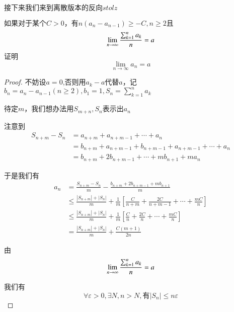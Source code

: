 \documentclass[lang=cn,10pt]{elegantbook}
\begin{document}
	接下来我们来到离散版本的反向$stolz$
	\begin{example}
		$\text{如果对于某个}C>0\text{，有}n\left( a_n-a_{n-1} \right) \ge -C,n\ge 2\text{且}$
		\begin{equation*}
			\lim_{n\rightarrow \infty} \small{\frac{\sum_{k=1}^n{a_k}}{n}}=a
		\end{equation*}
		证明
		\begin{equation*}
			\lim_{n\rightarrow \infty} a_n=a
		\end{equation*}
	\end{example}
	\begin{proof}
		不妨设$a=0$,否则用$a_{k}-a$代替$a$，记$b_{n}=a_{n}-a_{n-1}(n\ge 2),b_{1}=1,S_{n}=\sum_{k=1}^n{a_k}$
		
		待定$m$，我们想办法用$S_{m+n},S_{n}$表示出$a_{n}$
		
		注意到
		\begin{equation*}
			\begin{aligned}
				S_{n+m}-S_n&=a_{n+m}+a_{n+m-1}+\cdots +a_n
				\\
				&=b_{n+m}+a_{n+m-1}+b_{n+m-1}+a_{n+m-1}+\cdots +a_n
				\\
				&=b_{n+m}+2b_{n+m-1}+\cdots +mb_{n+1}+ma_n
			\end{aligned}
		\end{equation*}
		
		于是我们有
		\begin{equation*}
			\begin{aligned}
				a_n&=\frac{S_{n+m}-S_n}{m}-\frac{b_{n+m}+2b_{n+m-1}+mb_{n+1}}{m}
				\\
				&\le \frac{\left| S_{n+m} \right|+\left| S_n \right|}{m}+\frac{1}{m}\left[ \frac{C}{n+m}+\frac{2C}{n+m-1}+\cdots +\frac{mC}{n} \right] 
				\\
				&\le \frac{\left| S_{n+m} \right|+\left| S_n \right|}{m}+\frac{1}{m}\left[ \frac{C}{n}+\frac{2C}{n}+\cdots +\frac{mC}{n} \right] 
				\\
				&=\frac{\left| S_{n+m} \right|+\left| S_n \right|}{m}+\frac{C\left( m+1 \right)}{2n}
			\end{aligned}
		\end{equation*}
		
		由
			\begin{equation*}
				\lim_{n\rightarrow \infty} \small{\frac{\sum_{k=1}^n{a_k}}{n}}=a
			\end{equation*}
		
		我们有
	     \begin{equation*}
	     	\forall \varepsilon >0,\exists N,n>N,\text{有}|S_n|\le n\varepsilon 
	     \end{equation*}
	     

\end{proof}
\end{document}

